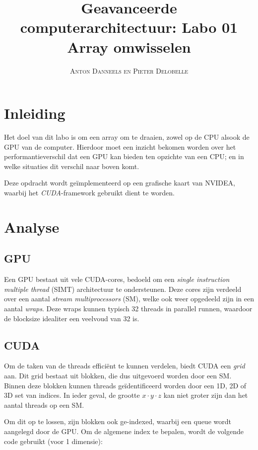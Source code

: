\documentclass[10pt, twocolumn, a4paper]{article}
\begin{document}
\title{Geavanceerde computerarchitectuur: Labo 01 \\ 
\large{Array omwisselen}}
\author{\textsc{Anton Danneels en Pieter Delobelle}}
\date{}
\maketitle

\section{Inleiding}
Het doel van dit labo is om een array om te draaien, zowel op de CPU alsook de GPU van de computer. 
Hierdoor moet een inzicht bekomen worden over het performantieverschil dat een GPU kan bieden ten opzichte van een CPU; en in welke situaties dit verschil naar boven komt.

Deze opdracht wordt ge\"implementeerd op een grafische kaart van NVIDEA, waarbij het \emph{CUDA}-framework gebruikt dient te worden. 

\section{Analyse}

\subsection{GPU}
Een GPU bestaat uit vele CUDA-cores, bedoeld om een \emph{single instruction multiple thread} (SIMT) architectuur te ondersteunen. Deze cores zijn verdeeld over een aantal \emph{stream multiprocessors} (SM), welke ook weer opgedeeld zijn in een aantal \emph{wraps}. Deze wraps kunnen typisch 32 threads in parallel runnen, waardoor de blocksize idealiter een veelvoud van 32 is.

\subsection{CUDA}
Om de taken van de threads effici\"ent te kunnen verdelen, biedt CUDA een \emph{grid} aan. Dit grid bestaat uit blokken, die dus uitgevoerd worden door een SM. Binnen deze blokken kunnen threads ge\"identificeerd worden door een 1D, 2D of 3D set van indices. In ieder geval, de grootte $x \cdot y \cdot z$ kan niet groter zijn dan het aantal threads op een SM.

Om dit op te lossen, zijn blokken ook ge-indexed, waarbij een queue wordt aangelegd door de GPU. Om de algemene index te bepalen, wordt de volgende code gebruikt (voor 1 dimensie): 
\end{document}
